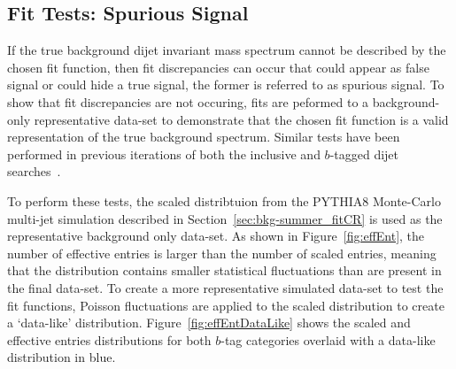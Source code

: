 \subsection{Fit Tests: Spurious Signal}
\label{sec:bkg-summer_spusig}

If the true background dijet invariant mass spectrum cannot be described by the chosen fit function,
then fit discrepancies can occur that could appear as false signal or could hide a true signal,
the former is referred to as spurious signal.
To show that fit discrepancies are not occuring, fits are peformed to a background-only representative data-set
to demonstrate that the chosen fit function is a valid representation of the true background spectrum.
Similar tests have been performed in previous iterations of both the inclusive and $b$-tagged dijet searches~\cite{dijet-mori16_paper,dibjet-mori16_paper}.

To perform these tests, the scaled distribtuion from the PYTHIA8 Monte-Carlo multi-jet simulation
described in Section~\ref{sec:bkg-summer_fitCR}
is used as the representative background only data-set.
As shown in Figure~\ref{fig:effEnt},
the number of effective entries is larger than the number of scaled entries,
meaning that the distribution contains smaller statistical fluctuations than are present in the final data-set.
To create a more representative simulated data-set to test the fit functions,
Poisson fluctuations are applied to the scaled distribution to create a `data-like' distribution.
Figure~\ref{fig:effEntDataLike} shows the scaled and effective entries distributions for both
$b$-tag categories overlaid with a data-like distribution in blue.

